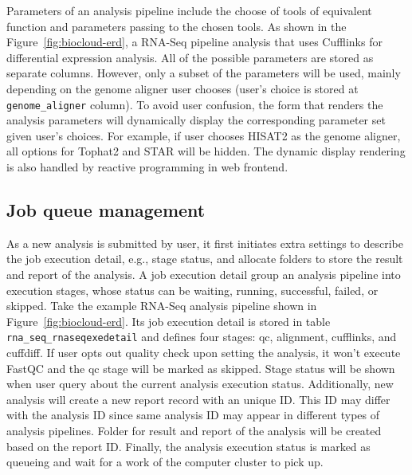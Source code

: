Parameters of an analysis pipeline include the choose of tools of equivalent
function and parameters passing to the chosen tools. As shown in the
Figure~\ref{fig:biocloud-erd}, a RNA-Seq pipeline analysis that uses Cufflinks
for differential expression analysis. All of the possible parameters are
stored as separate columns. However, only a subset of the parameters will be
used, mainly depending on the genome aligner user chooses (user's choice is stored
at \texttt{genome\_aligner} column). To avoid user confusion, the form that
renders the analysis parameters will dynamically display the corresponding
parameter set given user's choices. For example, if user chooses HISAT2 as the
genome aligner, all options for Tophat2 and STAR will be hidden. The dynamic
display rendering is also handled by reactive programming in web frontend.


\subsection{Job queue management}


As a new analysis is submitted by user, it first initiates extra settings to
describe the job execution detail, e.g., stage status, and allocate folders to
store the result and report of the analysis. A job execution detail group an
analysis pipeline into execution stages, whose status can be waiting, running,
successful, failed, or skipped. Take the example RNA-Seq analysis pipeline
shown in Figure~\ref{fig:biocloud-erd}. Its job execution detail is stored in
table \texttt{rna\_seq\_rnaseqexedetail} and defines four stages: qc,
alignment, cufflinks, and cuffdiff. If user opts out quality
check upon setting the analysis, it won't execute FastQC and the qc stage will
be marked as skipped. Stage status will be shown when user query about the
current analysis execution status. Additionally, new analysis will create a new
report record with an unique ID. This ID may differ with the analysis ID since
same analysis ID may appear in different types of analysis pipelines. Folder
for result and report of the analysis will be created based on the report ID.
Finally, the analysis execution status is marked as queueing and wait for a
work of the computer cluster to pick up.


